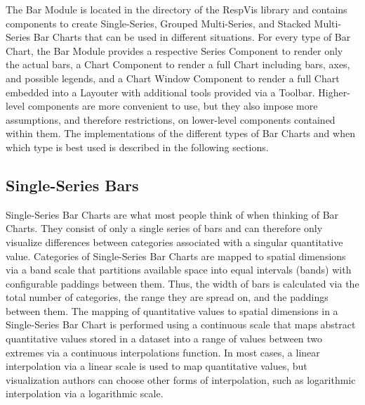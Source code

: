 The Bar Module is located in the  directory of the RespVis library and contains components to create Single-Series, Grouped Multi-Series, and Stacked Multi-Series Bar Charts that can be used in different situations.
For every type of Bar Chart, the Bar Module provides a respective Series Component to render only the actual bars, a Chart Component to render a full Chart including bars, axes, and possible legends, and a Chart Window Component to render a full Chart embedded into a Layouter with additional tools provided via a Toolbar.
Higher-level components are more convenient to use, but they also impose more assumptions, and therefore restrictions, on lower-level components contained within them.
The implementations of the different types of Bar Charts and when which type is best used is described in the following sections.

\subsection{Single-Series Bars}


Single-Series Bar Charts are what most people think of when thinking of Bar Charts.
They consist of only a single series of bars and can therefore only visualize differences between categories associated with a singular quantitative value.
Categories of Single-Series Bar Charts are mapped to spatial dimensions via a band scale that partitions available space into equal intervals (bands) with configurable paddings between them.
Thus, the width of bars is calculated via the total number of categories, the range they are spread on, and the paddings between them.
The mapping of quantitative values to spatial dimensions in a Single-Series Bar Chart is performed using a continuous scale that maps abstract quantitative values stored in a dataset into a range of values between two extremes via a continuous interpolations function.
In most cases, a linear interpolation via a linear scale is used to map quantitative values, but visualization authors can choose other forms of interpolation, such as logarithmic interpolation via a logarithmic scale.

